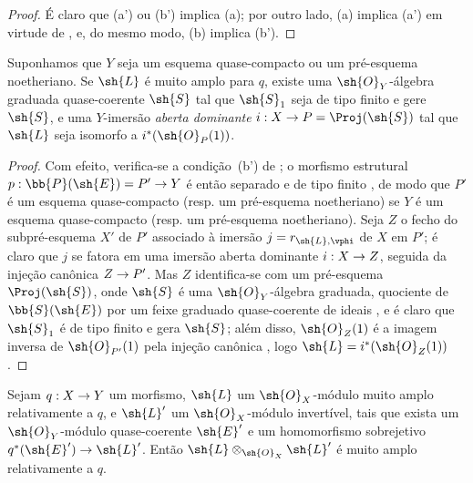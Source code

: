 \documentclass[oneside,10pt]{amsart}
\makeatletter
\newcommand{\ega@arrow}[2]{\mathchoice{#1}{#2}{#2}{#2}}
\renewcommand{\to}{\ega@arrow{\longrightarrow}{\rightarrow}}
\let\EGAOriginalLabel\label
\renewcommand{\label}[1]{\phantomsection\EGAOriginalLabel{#1}}
\makeatother
\begin{document}
\begin{proof}
É claro que (a') ou (b') implica (a);
por outro lado, (a) implica (a') em virtude de , e, do mesmo modo, (b) implica (b').
\end{proof}

\begin{corollary}[4.4.7]
\label{II.4.4.7}
Suponhamos que $Y$ seja um esquema quase-compacto ou um pré-esquema noetheriano.
Se $\sh{L}$ é muito amplo para $q$, existe uma $\sh{O}_Y$-álgebra graduada quase-coerente $\sh{S}$ tal que $\sh{S}_1$ seja de tipo finito e gere $\sh{S}$, e uma $Y$-imersão \emph{aberta dominante} $i:X\to P=\Proj(\sh{S})$ tal que $\sh{L}$ seja isomorfo a $i^*(\sh{O}_P(1))$.
\end{corollary}

\begin{proof}
Com efeito, verifica-se a condição~(b') de ;
o morfismo estrutural $p:\bb{P}(\sh{E})=P'\to Y$ é então separado e de tipo finito , de modo que $P'$ é um esquema quase-compacto (resp. um pré-esquema noetheriano) se $Y$ é um esquema quase-compacto (resp. um pré-esquema noetheriano).
Seja $Z$ o fecho  do subpré-esquema $X'$ de $P'$ associado à imersão $j=r_{\sh{L},\vphi}$ de $X$ em $P'$;
é claro que $j$ se fatora em uma imersão aberta dominante $i:X\to Z$, seguida da injeção canônica $Z\to P'$.
Mas $Z$ identifica-se com um pré-esquema $\Proj(\sh{S})$, onde $\sh{S}$ é uma $\sh{O}_Y$-álgebra graduada, quociente de $\bb{S}(\sh{E})$ por um feixe graduado quase-coerente de ideais , e é claro que $\sh{S}_1$ é de tipo finito e gera $\sh{S}$;
além disso, $\sh{O}_Z(1)$ é a imagem inversa de $\sh{O}_{P'}(1)$ pela injeção canônica , logo $\sh{L}=i^*(\sh{O}_Z(1))$.
\end{proof}

\begin{proposition}[4.4.8]
\label{II.4.4.8}
Sejam $q:X\to Y$ um morfismo, $\sh{L}$ um $\sh{O}_X$-módulo muito amplo relativamente a $q$, e $\sh{L}'$ um $\sh{O}_X$-módulo invertível, tais que exista um $\sh{O}_Y$-módulo quase-coerente $\sh{E}'$ e um homomorfismo sobrejetivo $q^*(\sh{E}')\to\sh{L}'$.
Então $\sh{L}\otimes_{\sh{O}_X}\sh{L}'$ é muito amplo relativamente a $q$.
\end{proposition}
\end{document}
